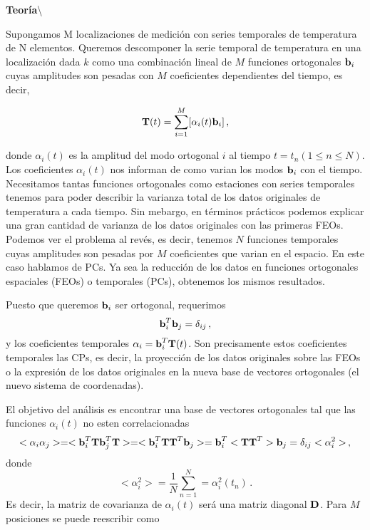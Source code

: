 \documentclass[
]{agujournal2019}
\begin{document}
\vspace{0.25cm}

\textbf {Teoría}\textbackslash{}

Supongamos M localizaciones de medición con series temporales de
temperatura de N elementos. Queremos descomponer la serie temporal de
temperatura en una localización dada \(k\) como una combinación lineal
de \(M\) funciones ortogonales \({\textbf b}_i\) cuyas amplitudes son
pesadas con \(M\) coeficientes dependientes del tiempo, es decir,

\[{\textbf T}(t)=\sum\limits^M_{i=1}[\alpha_i(t){\textbf b}_{i}]\,,\]

donde \(\alpha_i(t)\) es la amplitud del modo ortogonal \(i\) al tiempo
\(t=t_n(1\le n\le N)\). Los coeficientes \(\alpha_i(t)\) nos informan de
como varian los modos \({\textbf b}_{i}\) con el tiempo. Necesitamos
tantas funciones ortogonales como estaciones con series temporales
tenemos para poder describir la varianza total de los datos originales
de temperatura a cada tiempo. Sin mebargo, en términos prácticos podemos
explicar una gran cantidad de varianza de los datos originales con las
primeras FEOs. Podemos ver el problema al revés, es decir, tenemos \(N\)
funciones temporales cuyas amplitudes son pesadas por \(M\) coeficientes
que varian en el espacio. En este caso hablamos de PCs. Ya sea la
reducción de los datos en funciones ortogonales espaciales (FEOs) o
temporales (PCs), obtenemos los mismos resultados.

Puesto que queremos \({\textbf b}_{i}\) ser ortogonal, requerimos
\[{\textbf b}^T_i {\textbf b}_{j}=\delta_{ij}\,,\] y los coeficientes
temporales \(\alpha_i={\textbf b}^T_{i}{\textbf T}(t)\). Son
precisamente estos coeficientes temporales las CPs, es decir, la
proyección de los datos originales sobre las FEOs o la expresión de los
datos originales en la nueva base de vectores ortogonales (el nuevo
sistema de coordenadas).

El objetivo del análisis es encontrar una base de vectores ortogonales
tal que las funciones \(\alpha_i(t)\) no esten correlacionadas
\[<\alpha_i \alpha_j>=<{\textbf b}^T_{i}{\textbf T}{\textbf b}^T_{j}{\textbf T}>=<{\textbf b}^T_{i}{\textbf T}{\textbf T}^T{\textbf b}_{j}>={\textbf b}^T_{i}<{\textbf T} {\textbf T}^T>{\textbf b}_{j}=\delta_{ij}<\alpha^2_i>\,,\]
donde \[<\alpha_i^2>=\frac{1}{N}\sum\limits^N_{n=1}=\alpha^2_i(t_n)\,.\]
Es decir, la matriz de covarianza de \(\alpha_i(t)\) será una matriz
diagonal \({\textbf D}\). Para \(M\) posiciones se puede reescribir como
\end{document}
